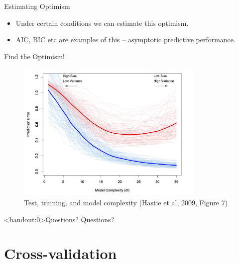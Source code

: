 \documentclass[10pt,handout]{beamer}
\begin{document}
\begin{frame}{Estimating Optimism}

\begin{itemize}
\item Under certain conditions we can estimate this optimism.
\item AIC, BIC etc are examples of this -- asymptotic predictive performance.
\end{itemize}



\end{frame}


\begin{frame}{Find the Optimism!}

\begin{figure}[h]
\caption{Test, training, and model complexity (Hastie et al, 2009, Figure 7)}
\centering
\includegraphics[width=0.8\textwidth]{figs/ESL_7_1.png}
\end{figure}


\end{frame}



\begin{frame}<handout:0>{Questions?}
Questions?
\end{frame}


\section{Cross-validation}
\frame{\sectionpage}
\end{document}
